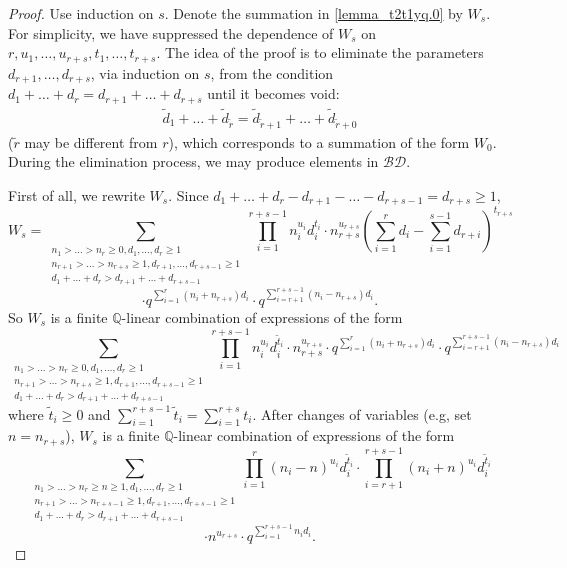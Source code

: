 \documentclass[10pt,a4paper]{amsart}
\newcommand{\BD}{\mathcal {BD}}
\newcommand{\Q}{ \mathbb Q }
\newcommand{\w}{\tilde}
\begin{document}
\begin{proof}
Use induction on $s$. 
Denote the summation in \eqref{lemma_t2t1yq.0} by $W_s$. 
For simplicity, we have suppressed the dependence of $W_s$ on 
$r, u_1, \ldots, u_{r+s}, t_1, \ldots, t_{r+s}$. 
The idea of the proof is to eliminate the parameters 
$d_{r+1}, \ldots, d_{r+s}$, via induction on $s$, from the condition 
$d_1+ \ldots + d_r = d_{r+1} + \ldots + d_{r+s}$ until it becomes void:
\begin{eqnarray}  \label{lemma_t2t1yq.100}
\w d_1+ \ldots + \w d_{\w r} = \w d_{\w r+1} + \ldots + \w d_{\w r+0}
\end{eqnarray}
($\w r$ may be different from $r$), 
which corresponds to a summation of the form $W_0$. 
During the elimination process, we may produce elements in $\BD$.

First of all, we rewrite $W_s$. Since $d_1+ \ldots + d_r 
- d_{r+1} - \ldots - d_{r+s-1} = d_{r+s} \ge 1$, 
$$
W_s = \sum_{\substack{n_1 > \ldots > n_r \ge 0, d_1, \ldots, d_r \ge 1\\
    n_{r+1} > \ldots > n_{r+s} \ge 1, d_{r+1}, \ldots, d_{r+s-1} \ge 1\\
    d_1+ \ldots + d_r > d_{r+1} + \ldots + d_{r+s-1}}}
  \prod_{i=1}^{r+s-1} n_i^{u_i}d_i^{t_i} \cdot n_{r+s}^{u_{r+s}}
  \left (\sum_{i=1}^r d_i - \sum_{i=1}^{s-1} d_{r+i} \right )^{t_{r+s}} 
$$
$$
\cdot q^{\sum_{i=1}^{r} (n_i + n_{r+s})d_i}
\cdot q^{\sum_{i=r+1}^{r+s-1} (n_i - n_{r+s})d_i}.
$$
So $W_s$ is a finite $\Q$-linear combination of expressions of the form
$$
\sum_{\substack{n_1 > \ldots > n_r \ge 0, d_1, \ldots, d_r \ge 1\\
  n_{r+1} > \ldots > n_{r+s} \ge 1, d_{r+1}, \ldots, d_{r+s-1} \ge 1\\
  d_1+ \ldots + d_r > d_{r+1} + \ldots + d_{r+s-1}}}
  \prod_{i=1}^{r+s-1} n_i^{u_i}d_i^{\w t_i} \cdot n_{r+s}^{u_{r+s}} 
  \cdot q^{\sum_{i=1}^{r} (n_i + n_{r+s})d_i}
  \cdot q^{\sum_{i=r+1}^{r+s-1} (n_i - n_{r+s})d_i}
$$
where $\w t_i \ge 0$ and $\sum_{i=1}^{r+s-1} \w t_i 
= \sum_{i=1}^{r+s} t_i$. 
After changes of variables (e.g, set $n = n_{r+s}$), 
$W_s$ is a finite $\Q$-linear combination of expressions of the form 
$$
\sum_{\substack{n_1 > \ldots > n_r \ge n \ge 1, d_1, \ldots, d_r \ge 1\\
    n_{r+1} > \ldots > n_{r+s-1} \ge 1, d_{r+1}, \ldots, d_{r+s-1} \ge 1\\
    d_1+ \ldots + d_r > d_{r+1} + \ldots + d_{r+s-1}}}
   \prod_{i=1}^{r} (n_i-n)^{u_i}d_i^{\w t_i} \cdot 
   \prod_{i=r+1}^{r+s-1} (n_i+n)^{u_i}d_i^{\w t_i} 
$$
$$
\cdot n^{u_{r+s}} \cdot q^{\sum_{i=1}^{r+s-1} n_i d_i}.
$$
\end{proof}
\end{document}
